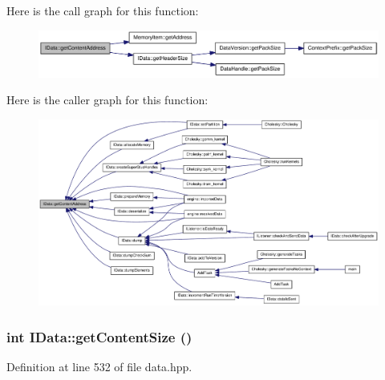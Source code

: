 Here is the call graph for this function:\nopagebreak
\begin{figure}[H]
\begin{center}
\leavevmode
\includegraphics[width=341pt]{class_i_data_a513a1ad05e427af81ca7c34291826efb_cgraph}
\end{center}
\end{figure}


Here is the caller graph for this function:\nopagebreak
\begin{figure}[H]
\begin{center}
\leavevmode
\includegraphics[width=420pt]{class_i_data_a513a1ad05e427af81ca7c34291826efb_icgraph}
\end{center}
\end{figure}
\hypertarget{class_i_data_a32479396ae443e9e80f6517fd1e20f35}{
\subsubsection[{getContentSize}]{\setlength{\rightskip}{0pt plus 5cm}int IData::getContentSize ()}}
\label{class_i_data_a32479396ae443e9e80f6517fd1e20f35}


Definition at line 532 of file data.hpp.

